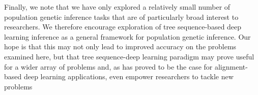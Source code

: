 Finally, we note that we have only explored a relatively small number of population genetic inference tasks that are of particularly broad interest to researchers. We therefore encourage exploration of tree sequence-based deep learning inference as a general framework for population genetic inference. Our hope is that this may not only lead to improved accuracy on the problems examined here, but that tree sequence-deep learning paradigm may prove useful for a wider array of problems and, as has proved to be the case for alignment-based deep learning applications, even empower researchers to tackle new problems \cite{batteyVisualizingPopulationStructure2021,bookerThisPopulationDoes2023,korfmannDeepLearningPopulation2023a,smithDispersalInferencePopulation2023,whitehouseTimesweeperAccuratelyIdentifying2023,yelmenCreatingArtificialHuman2021}
